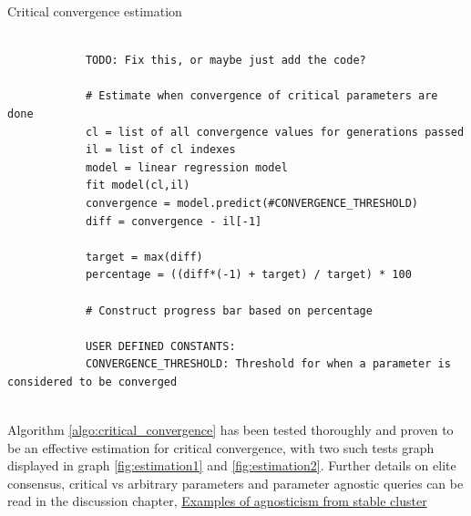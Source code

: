 \documentclass[a4paper,english]{report}
\begin{document}
		\begin{algorithm}
			\caption{Critical convergence estimation}\label{algo:critical_convergence}
			\scriptsize
			\begin{verbatim}
			
			TODO: Fix this, or maybe just add the code?
			
			# Estimate when convergence of critical parameters are done
			cl = list of all convergence values for generations passed
			il = list of cl indexes
			model = linear regression model
			fit model(cl,il)
			convergence = model.predict(#CONVERGENCE_THRESHOLD)
			diff = convergence - il[-1]
			
			target = max(diff)
			percentage = ((diff*(-1) + target) / target) * 100
			
			# Construct progress bar based on percentage
			
			USER DEFINED CONSTANTS:
			CONVERGENCE_THRESHOLD: Threshold for when a parameter is considered to be converged
			
			\end{verbatim}
		\end{algorithm}
		\clearpage
		Algorithm \ref{algo:critical_convergence} has been tested thoroughly and proven to be an effective estimation for critical convergence, with two such tests graph displayed in graph \ref{fig:estimation1} and \ref{fig:estimation2}. Further details on elite consensus, critical vs arbitrary parameters and parameter agnostic queries can be read in the discussion chapter, \hyperref[sec:agnosstable]{Examples of agnosticism from stable cluster}
\end{document}
